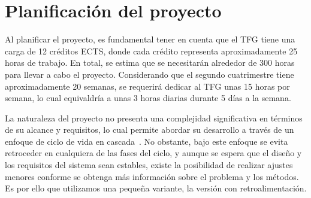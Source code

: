 \section{Planificación del proyecto}
Al planificar el proyecto, es fundamental tener en cuenta que el TFG 
tiene una carga de 12 créditos ECTS, donde cada 
crédito representa aproximadamente 25 horas de trabajo. 
En total, se estima que se necesitarán alrededor de 300 horas para llevar a cabo 
el proyecto. Considerando que el segundo cuatrimestre tiene aproximadamente 20 semanas, 
se requerirá dedicar al TFG unas 15 horas por semana, lo cual equivaldría a unas 3 horas 
diarias durante 5 días a la semana.
 
La naturaleza del proyecto no presenta una complejidad significativa en términos 
de su alcance y requisitos, lo cual permite abordar su desarrollo a través de un 
enfoque de ciclo de vida en cascada~\cite{ModeloEnCascada}. 
No obstante, bajo este enfoque se evita retroceder en cualquiera de las fases 
del ciclo, y aunque se espera que el diseño y los requisitos del sistema sean 
estables, existe la posibilidad de realizar ajustes menores conforme se obtenga
más información sobre el problema y los métodos. 
Es por ello que utilizamos una pequeña variante, la versión con retroalimentación.
 
